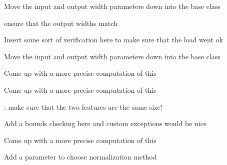
\begin{DoxyRefList}
\item[\label{todo__todo000003}%
\hypertarget{todo__todo000003}{}%
\-Member \hyperlink{classhsom_1_1_a_n_n_classifier_a2777506e21fc1fcb2900ede529aaefac}{hsom\-:\-:\-A\-N\-N\-Classifier\-:\-:classify} (\-Suspect\-Ptr suspect)]\-Move the input and output width parameters down into the base class 

ensure that the output widths match  
\item[\label{todo__todo000001}%
\hypertarget{todo__todo000001}{}%
\-Member \hyperlink{classhsom_1_1_a_n_n_classifier_a615dc19a6aa3f45ee00926e2707386e0}{hsom\-:\-:\-A\-N\-N\-Classifier\-:\-:read\-Classifier\-Data} (\-Q\-Dom\-Element \&element)]\-Insert some sort of verification here to make sure that the load went ok  
\item[\label{todo__todo000002}%
\hypertarget{todo__todo000002}{}%
\-Member \hyperlink{classhsom_1_1_a_n_n_classifier_ac3f43b1ab6681ad13acc52924e3c3fc5}{hsom\-:\-:\-A\-N\-N\-Classifier\-:\-:train\-Classifier} (\-Q\-Vector$<$ Suspect\-Ptr $>$ suspects, \-Q\-Map$<$ Q\-String, Q\-Variant $>$ training\-Parameters)]\-Move the input and output width parameters down into the base class  
\item[\label{todo__todo000006}%
\hypertarget{todo__todo000006}{}%
\-Member \hyperlink{classhsom_1_1_fast_hex_grid_a7fc65f0095eb0b5e14d41b116ea140d4}{hsom\-:\-:\-Fast\-Hex\-Grid$<$ \-T $>$\-:\-:diagonal} ()]\-Come up with a more precise computation of this 

\-Come up with a more precise computation of this  
\item[\label{todo__todo000005}%
\hypertarget{todo__todo000005}{}%
\-Member \hyperlink{classhsom_1_1_feature_afef971a3f4a596af3b7f6bfa8dd77341}{hsom\-:\-:\-Feature\-:\-:distance} (\-Feature other) const ]\-: make sure that the two features are the same size!  
\item[\label{todo__todo000007}%
\hypertarget{todo__todo000007}{}%
\-Member \hyperlink{classhsom_1_1_grid_ac4d7188e7b75823a03a53317656473fa}{hsom\-:\-:\-Grid$<$ \-T $>$\-:\-:operator\mbox{[}\mbox{]}} (int idx)]\-Add a bounds checking here and custom exceptions would be nice  
\item[\label{todo__todo000008}%
\hypertarget{todo__todo000008}{}%
\-Member \hyperlink{classhsom_1_1_hex_grid_aa1fe9291ee1c82da00bca12b906959cb}{hsom\-:\-:\-Hex\-Grid$<$ \-T $>$\-:\-:diagonal} ()]\-Come up with a more precise computation of this  
\item[\label{todo__todo000012}%
\hypertarget{todo__todo000012}{}%
\-Member \hyperlink{classhsom_1_1_histogram_a8f4a1e9947fa29a974e550c0b97f7496}{hsom\-:\-:\-Histogram\-:\-:normalize} ()]\-Add a parameter to choose normalization method 


\end{DoxyRefList}
